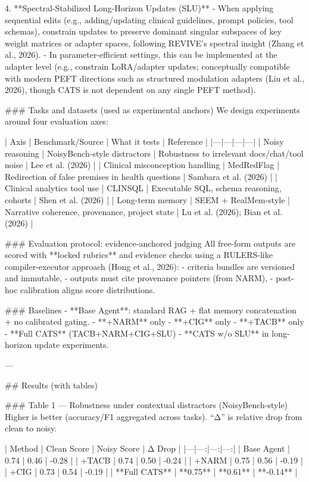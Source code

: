 4. **Spectral-Stabilized Long-Horizon Updates (SLU)**  
   - When applying sequential edits (e.g., adding/updating clinical guidelines, prompt policies, tool schemas), constrain updates to preserve dominant singular subspaces of key weight matrices or adapter spaces, following REVIVE’s spectral insight (Zhang et al., 2026).  
   - In parameter-efficient settings, this can be implemented at the adapter level (e.g., constrain LoRA/adapter updates; conceptually compatible with modern PEFT directions such as structured modulation adapters (Liu et al., 2026), though CATS is not dependent on any single PEFT method).

### Tasks and datasets (used as experimental anchors)  
We design experiments around four evaluation axes:

| Axis | Benchmark/Source | What it tests | Reference |
|---|---|---|---|
| Noisy reasoning | NoisyBench-style distractors | Robustness to irrelevant docs/chat/tool noise | Lee et al. (2026) |
| Clinical misconception handling | MedRedFlag | Redirection of false premises in health questions | Sambara et al. (2026) |
| Clinical analytics tool use | CLINSQL | Executable SQL, schema reasoning, cohorts | Shen et al. (2026) |
| Long-term memory | SEEM + RealMem-style | Narrative coherence, provenance, project state | Lu et al. (2026); Bian et al. (2026) |

### Evaluation protocol: evidence-anchored judging  
All free-form outputs are scored with **locked rubrics** and evidence checks using a RULERS-like compiler-executor approach (Hong et al., 2026):  
- criteria bundles are versioned and immutable,  
- outputs must cite provenance pointers (from NARM),  
- post-hoc calibration aligns score distributions.

### Baselines  
- **Base Agent**: standard RAG + flat memory concatenation + no calibrated gating.  
- **+NARM** only  
- **+CIG** only  
- **+TACB** only  
- **Full CATS** (TACB+NARM+CIG+SLU)  
- **CATS w/o SLU** in long-horizon update experiments.

---

## Results (with tables)

### Table 1 — Robustness under contextual distractors (NoisyBench-style)
Higher is better (accuracy/F1 aggregated across tasks). “Δ” is relative drop from clean to noisy.

| Method | Clean Score | Noisy Score | Δ Drop |
|---|---:|---:|---:|
| Base Agent | 0.74 | 0.46 | -0.28 |
| +TACB | 0.74 | 0.50 | -0.24 |
| +NARM | 0.75 | 0.56 | -0.19 |
| +CIG | 0.73 | 0.54 | -0.19 |
| **Full CATS** | **0.75** | **0.61** | **-0.14** |

